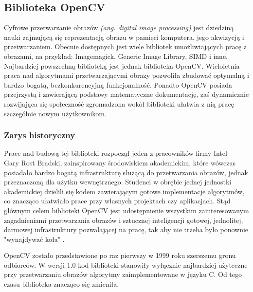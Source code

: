 \documentclass[a4paper,12pt]{article}
\newcommand\spacingIndent{2.2em}
\begin{document}
		\subsection{Biblioteka OpenCV}
		\hspace{\spacingIndent} Cyfrowe przetwarzanie obrazów \textit{(ang. digital image processing)} jest dziedziną nauki 
			zajmującą się reprezentacją obrazu w pamięci komputera, jego akwizycją i przetwarzaniem. 
         Obecnie dostępnych jest wiele bibliotek umożliwiających pracę z obrazami, na przykład: Imagemagick, Generic Image Library, SIMD i inne. 
			Najbardziej powszechną biblioteką jest jednak biblioteka OpenCV. Wieloletnia praca nad algorytmami przetwarzającymi obrazy pozwoliła zbudować optymalną i bardzo bogatą, bezkonkurencyjną funkcjonalność.
			Ponadto OpenCV posiada przejrzystą 
			i zawierającą podstawy matematyczne dokumentację, zaś dynamicznie rozwijająca się społeczność zgromadzona wokół biblioteki ułatwia 
			z nią pracę szczególnie nowym użytkownikom.
		\subsubsection{Zarys historyczny}
			\hspace{\spacingIndent} Prace nad budową tej biblioteki rozpoczął jeden z pracowników firmy Intel -- Gary Rost Bradski, 
				zainspirowany środowiskiem akademickim, które wówczas posiadało bardzo bogatą infrastrukturę służącą do przetwarzania obrazów, 
				jednak przeznaczoną dla użytku wewnętrznego. Studenci w obrębie jednej jednostki akademickiej dzielili się kodem zawierającym gotowe 
				implementacje algorytmów, co znacząco ułatwiało prace przy własnych projektach czy aplikacjach. Stąd głównym celem biblioteki OpenCV 
				jest udostępnienie wszystkim zainteresowanym zagadnieniami przetwarzania obrazów i sztucznej inteligencji gotowej, jednolitej, 
				darmowej infrastruktury pozwalającej na pracę, tak aby nie trzeba było ponownie "wynajdywać koła" \cite{3}. 
				
			OpenCV zostało przedstawione po raz pierwszy w 1999 roku szerszemu gronu odbiorców.  W wersji 1.0 kod biblioteki stanowiły wyłącznie najbardziej użyteczne przy przetwarzaniu obrazów algorytmy zaimplementowane w języku C. 
				Od tego czasu biblioteka znacząco się zmieniła. 
			
\end{document}
